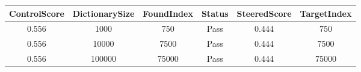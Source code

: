 \begin{table}[h]
\centering
\begin{tabular}{ |c|c|c|c|c|c| }
\hline
ControlScore & DictionarySize & FoundIndex & Status & SteeredScore & TargetIndex \\
\hline
0.556 & 1000 & 750 & Pass & 0.444 & 750 \\
\hline
0.556 & 10000 & 7500 & Pass & 0.444 & 7500 \\
\hline
0.556 & 100000 & 75000 & Pass & 0.444 & 75000 \\
\hline
\end{tabular}
\end{table}
